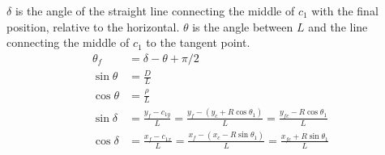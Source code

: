 \documentclass[12pt]{article}
\begin{document}
$\delta$ is the angle of the straight line connecting the middle of $c_1$ with the final position, relative to the horizontal. $\theta$ is the angle between $L$ and the line connecting the middle of $c_1$ to the tangent point.
\begin{align}
    \theta_f &= \delta - \theta + \pi/2\\
    \sin\theta &= \frac{D}{L}\\
    \cos\theta &= \frac{\rho}{L}\\
    \sin\delta &= \frac{y_f-c_{1y}}{L}
    = \frac{y_f-(y_c + R\cos\theta_1)}{L}
    = \frac{y_{fc}-R\cos\theta_1}{L}\\
    \cos\delta &= \frac{x_f-c_{1x}}{L}
    = \frac{x_f-(x_c-R\sin\theta_1)}{L}
    = \frac{x_{fc} + R\sin\theta_1}{L}
\end{align}
\end{document}
